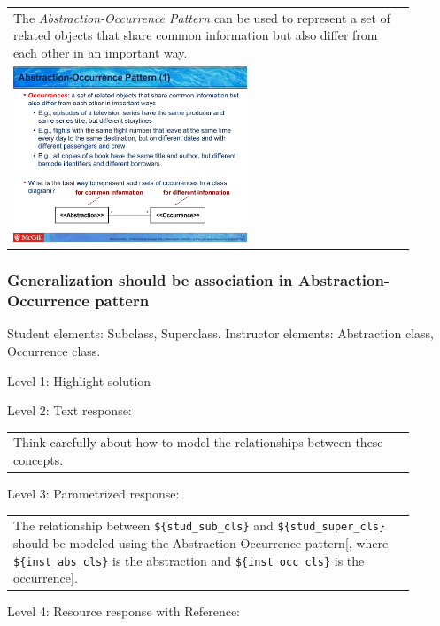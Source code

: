 \begin{tabular}{|p{0.9\linewidth}}
The \textit{Abstraction-Occurrence Pattern} can be used to 
represent a set of related objects that share common information but also differ
from each other in an important way.

\\
\includegraphics[width=0.6\textwidth]{images/abstraction_occurrence.png}
\end{tabular} \medskip


\subsubsection{Generalization should be association in Abstraction-Occurrence pattern}

Student elements: Subclass, Superclass. Instructor elements: Abstraction class, Occurrence class. \medskip

\noindent Level 1: Highlight solution  \medskip

\noindent Level 2: Text response: \medskip

\begin{tabular}{|p{0.9\linewidth}}
Think carefully about how to model the relationships between these concepts.
\end{tabular} \medskip

\noindent Level 3: Parametrized response: \medskip

\begin{tabular}{|p{0.9\linewidth}}
The relationship between \verb|${stud_sub_cls}| and \verb|${stud_super_cls}| should be modeled using the Abstraction-Occurrence pattern[, where \verb|${inst_abs_cls}| is the abstraction and \verb|${inst_occ_cls}| is the occurrence].
\end{tabular} \medskip

\noindent Level 4: Resource response with Reference: \medskip

